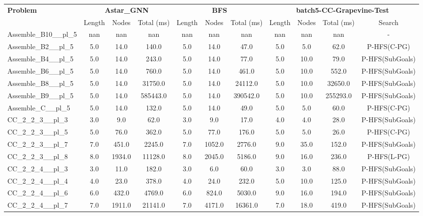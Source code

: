 \begin{table}[!ht]
\centering
\scriptsize
\begin{tabular}{l|ccc|ccc|cccc}
\multirow{2}{*}{\textbf{Problem}} & \multicolumn{3}{c|}{\textbf{Astar\_GNN}} & \multicolumn{3}{c|}{\textbf{BFS}} & \multicolumn{4}{c}{\textbf{batch5-CC-Grapevine-Test}} \\
\cline{2-11}
& Length & Nodes & Total (ms) & Length & Nodes & Total (ms) & Length & Nodes & Total (ms) & Search \\
\hline
Assemble\_B10\_\_pl\_5 & nan & nan & nan & nan & nan & nan & nan & nan & nan & - \\
Assemble\_B2\_\_pl\_5 & 5.0 & 14.0 & 140.0 & 5.0 & 14.0 & 47.0 & 5.0 & 5.0 & 62.0 & P-HFS(C-PG) \\
Assemble\_B4\_\_pl\_5 & 5.0 & 14.0 & 243.0 & 5.0 & 14.0 & 77.0 & 5.0 & 10.0 & 79.0 & P-HFS(SubGoals) \\
Assemble\_B6\_\_pl\_5 & 5.0 & 14.0 & 760.0 & 5.0 & 14.0 & 461.0 & 5.0 & 10.0 & 552.0 & P-HFS(SubGoals) \\
Assemble\_B8\_\_pl\_5 & 5.0 & 14.0 & 31750.0 & 5.0 & 14.0 & 24112.0 & 5.0 & 10.0 & 32650.0 & P-HFS(SubGoals) \\
Assemble\_B9\_\_pl\_5 & 5.0 & 14.0 & 585443.0 & 5.0 & 14.0 & 390542.0 & 5.0 & 10.0 & 255293.0 & P-HFS(SubGoals) \\
Assemble\_C\_\_pl\_5 & 5.0 & 14.0 & 132.0 & 5.0 & 14.0 & 49.0 & 5.0 & 5.0 & 60.0 & P-HFS(C-PG) \\
CC\_2\_2\_3\_\_pl\_3 & 3.0 & 9.0 & 62.0 & 3.0 & 9.0 & 17.0 & 4.0 & 4.0 & 28.0 & P-HFS(SubGoals) \\
CC\_2\_2\_3\_\_pl\_5 & 5.0 & 76.0 & 362.0 & 5.0 & 77.0 & 176.0 & 5.0 & 5.0 & 26.0 & P-HFS(C-PG) \\
CC\_2\_2\_3\_\_pl\_7 & 7.0 & 451.0 & 2245.0 & 7.0 & 1052.0 & 2776.0 & 9.0 & 35.0 & 152.0 & P-HFS(SubGoals) \\
CC\_2\_2\_3\_\_pl\_8 & 8.0 & 1934.0 & 11128.0 & 8.0 & 2045.0 & 5186.0 & 9.0 & 16.0 & 236.0 & P-HFS(L-PG) \\
CC\_2\_2\_4\_\_pl\_3 & 3.0 & 11.0 & 182.0 & 3.0 & 6.0 & 60.0 & 3.0 & 3.0 & 88.0 & P-HFS(SubGoals) \\
CC\_2\_2\_4\_\_pl\_4 & 4.0 & 23.0 & 378.0 & 4.0 & 24.0 & 232.0 & 5.0 & 10.0 & 125.0 & P-HFS(SubGoals) \\
CC\_2\_2\_4\_\_pl\_6 & 6.0 & 432.0 & 4769.0 & 6.0 & 824.0 & 5030.0 & 9.0 & 16.0 & 194.0 & P-HFS(SubGoals) \\
CC\_2\_2\_4\_\_pl\_7 & 7.0 & 1911.0 & 21141.0 & 7.0 & 4171.0 & 16361.0 & 7.0 & 18.0 & 419.0 & P-HFS(SubGoals) \\

\end{tabular}
\end{table}
